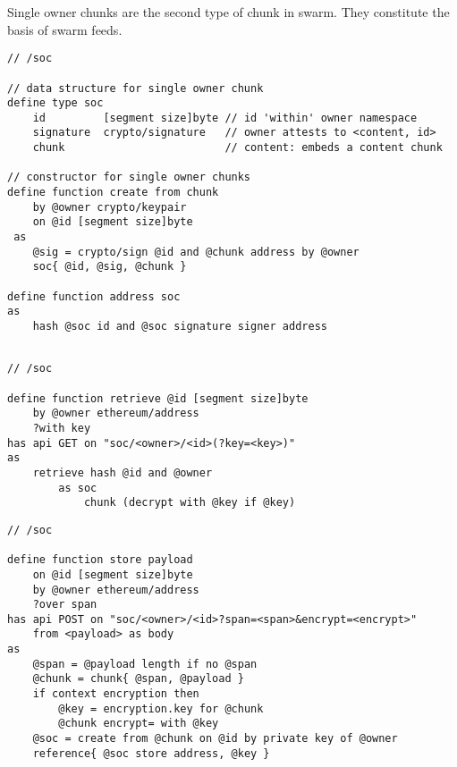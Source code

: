 Single owner chunks are the second type of chunk in swarm. They constitute the basis of swarm feeds.


\begin{definition}\label{def:buzz-soc}
\begin{lstlisting}[language=buzz1]
// /soc

// data structure for single owner chunk
define type soc 
    id         [segment size]byte // id 'within' owner namespace
    signature  crypto/signature   // owner attests to <content, id> 
    chunk                         // content: embeds a content chunk

// constructor for single owner chunks
define function create from chunk 
    by @owner crypto/keypair
    on @id [segment size]byte
 as
    @sig = crypto/sign @id and @chunk address by @owner
    soc{ @id, @sig, @chunk }

define function address soc
as
    hash @soc id and @soc signature signer address
    
\end{lstlisting}
\end{definition}

\begin{definition}\label{def:soc-retrieve}
\begin{lstlisting}[language=buzz1]
// /soc

define function retrieve @id [segment size]byte
    by @owner ethereum/address
    ?with key
has api GET on "soc/<owner>/<id>(?key=<key>)"
as
    retrieve hash @id and @owner 
        as soc
            chunk (decrypt with @key if @key)
\end{lstlisting}
\end{definition}


\begin{definition}\label{def:soc-store}
\begin{lstlisting}[language=buzz1]
// /soc

define function store payload
    on @id [segment size]byte
    by @owner ethereum/address 
    ?over span
has api POST on "soc/<owner>/<id>?span=<span>&encrypt=<encrypt>"
    from <payload> as body
as 
    @span = @payload length if no @span
    @chunk = chunk{ @span, @payload }
    if context encryption then
        @key = encryption.key for @chunk 
        @chunk encrypt= with @key
    @soc = create from @chunk on @id by private key of @owner
    reference{ @soc store address, @key }
             
\end{lstlisting}
\end{definition}

